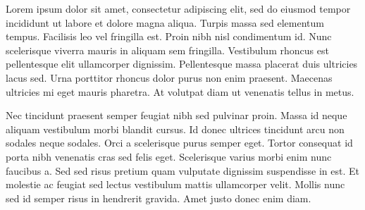 Lorem ipsum dolor sit amet, consectetur adipiscing elit, sed do eiusmod tempor incididunt ut labore et dolore magna aliqua. Turpis massa sed elementum tempus. Facilisis leo vel fringilla est. Proin nibh nisl condimentum id. Nunc scelerisque viverra mauris in aliquam sem fringilla. Vestibulum rhoncus est pellentesque elit ullamcorper dignissim. Pellentesque massa placerat duis ultricies lacus sed. Urna porttitor rhoncus dolor purus non enim praesent. Maecenas ultricies mi eget mauris pharetra. At volutpat diam ut venenatis tellus in metus.

Nec tincidunt praesent semper feugiat nibh sed pulvinar proin. Massa id neque aliquam vestibulum morbi blandit cursus. Id donec ultrices tincidunt arcu non sodales neque sodales. Orci a scelerisque purus semper eget. Tortor consequat id porta nibh venenatis cras sed felis eget. Scelerisque varius morbi enim nunc faucibus a. Sed sed risus pretium quam vulputate dignissim suspendisse in est. Et molestie ac feugiat sed lectus vestibulum mattis ullamcorper velit. Mollis nunc sed id semper risus in hendrerit gravida. Amet justo donec enim diam.

